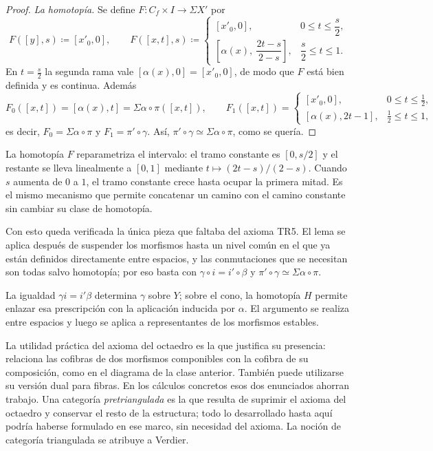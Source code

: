 \begin{proof}
\emph{La homotopía.} Se define $F\colon C_f\times I\to\Sigma X'$ por
\[
F([y],s)\coloneqq[x'_0,0],
\qquad
F([x,t],s)\coloneqq
\begin{cases}
[x'_0,0], & 0\le t\le\dfrac{s}{2},\\[6pt]
\left[\alpha(x),\ \dfrac{2t-s}{2-s}\right], & \dfrac{s}{2}\le t\le1 .
\end{cases}
\]
En $t=\tfrac s2$ la segunda rama vale $[\alpha(x),0]=[x'_0,0]$, de modo que $F$ está bien definida y es continua. Además
\[
F_0([x,t])=[\alpha(x),t]=\Sigma\alpha\circ\pi([x,t]),
\qquad
F_1([x,t])=
\begin{cases}
[x'_0,0], & 0\le t\le\tfrac12,\\[4pt]
[\alpha(x),2t-1], & \tfrac12\le t\le1,
\end{cases}
\]
es decir, $F_0=\Sigma\alpha\circ\pi$ y $F_1=\pi'\circ\gamma$. Así, $\pi'\circ\gamma\simeq\Sigma\alpha\circ\pi$, como se quería.
\end{proof}

\begin{nota}
   La homotopía $F$ reparametriza el intervalo: el tramo constante es $[0,s/2]$ y el restante se lleva linealmente a $[0,1]$ mediante $t\mapsto(2t-s)/(2-s)$. Cuando $s$ aumenta de $0$ a $1$, el tramo constante crece hasta ocupar la primera mitad. Es el mismo mecanismo que permite concatenar un camino con el camino constante sin cambiar su clase de homotopía.
\end{nota}

Con esto queda verificada la única pieza que faltaba del axioma \textup{TR5}. El lema se aplica después de suspender los morfismos hasta un nivel común en el que ya están definidos directamente entre espacios, y las conmutaciones que se necesitan son todas salvo homotopía; por eso basta con $\gamma\circ i=i'\circ\beta$ y $\pi'\circ\gamma\simeq\Sigma\alpha\circ\pi$.

\begin{nota}
   La igualdad $\gamma i=i'\beta$ determina $\gamma$ sobre $Y$; sobre el cono, la homotopía $H$ permite enlazar esa prescripción con la aplicación inducida por $\alpha$. El argumento se realiza entre espacios y luego se aplica a representantes de los morfismos estables.
\end{nota}

\begin{nota}
   La utilidad práctica del axioma del octaedro es la que justifica su presencia: relaciona las cofibras de dos morfismos componibles con la cofibra de su composición, como en el diagrama de la clase anterior. También puede utilizarse su versión dual para fibras. En los cálculos concretos esos dos enunciados ahorran trabajo. Una categoría \emph{pretriangulada} es la que resulta de suprimir el axioma del octaedro y conservar el resto de la estructura; todo lo desarrollado hasta aquí podría haberse formulado en ese marco, sin necesidad del axioma. La noción de categoría triangulada se atribuye a Verdier.
\end{nota}

